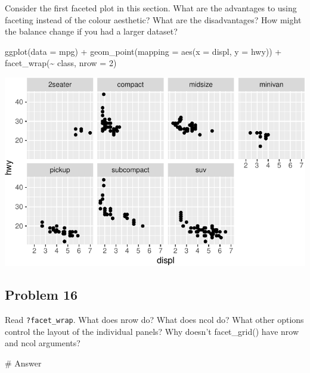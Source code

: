 \documentclass[
  letterpaper,
  DIV=11,
  numbers=noendperiod]{scrreprt}
\newenvironment{Shaded}{\begin{snugshade}}{\end{snugshade}}
\newcommand{\AttributeTok}[1]{\textcolor[rgb]{0.40,0.45,0.13}{#1}}
\newcommand{\CommentTok}[1]{\textcolor[rgb]{0.37,0.37,0.37}{#1}}
\newcommand{\DecValTok}[1]{\textcolor[rgb]{0.68,0.00,0.00}{#1}}
\newcommand{\FunctionTok}[1]{\textcolor[rgb]{0.28,0.35,0.67}{#1}}
\newcommand{\NormalTok}[1]{\textcolor[rgb]{0.00,0.23,0.31}{#1}}
\newcommand{\SpecialCharTok}[1]{\textcolor[rgb]{0.37,0.37,0.37}{#1}}
\begin{document}
Consider the first faceted plot in this section. What are the advantages
to using faceting instead of the colour aesthetic? What are the
disadvantages? How might the balance change if you had a larger dataset?

\begin{Shaded}
\begin{Highlighting}[]
\FunctionTok{ggplot}\NormalTok{(}\AttributeTok{data =}\NormalTok{ mpg) }\SpecialCharTok{+} 
  \FunctionTok{geom\_point}\NormalTok{(}\AttributeTok{mapping =} \FunctionTok{aes}\NormalTok{(}\AttributeTok{x =}\NormalTok{ displ, }\AttributeTok{y =}\NormalTok{ hwy)) }\SpecialCharTok{+} 
  \FunctionTok{facet\_wrap}\NormalTok{(}\SpecialCharTok{\textasciitilde{}}\NormalTok{ class, }\AttributeTok{nrow =} \DecValTok{2}\NormalTok{)}
\end{Highlighting}
\end{Shaded}

\includegraphics{Beginning_Data_Visualization_files/figure-pdf/Ex15-1.pdf}

\subsection*{Problem 16}\label{problem-16-1}

Read \texttt{?facet\_wrap}. What does nrow do? What does ncol do? What
other options control the layout of the individual panels? Why doesn't
facet\_grid() have nrow and ncol arguments?

\begin{Shaded}
\begin{Highlighting}[]
\CommentTok{\# Answer}
\end{Highlighting}
\end{Shaded}
\end{document}
